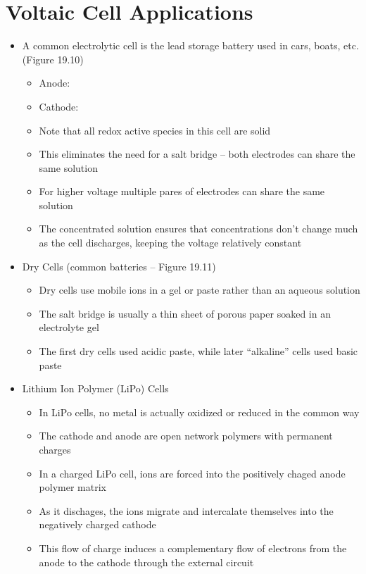 \documentclass[12pt, openany, letterpaper]{memoir}
\begin{document}
\section{Voltaic Cell Applications}
\begin{itemize}
	\item A common electrolytic cell is the lead storage battery used in cars, boats, etc. (Figure 19.10)
	\begin{itemize}
		\item Anode: 
		\item Cathode: 
		\item Note that all redox active species in this cell are solid
		\item This eliminates the need for a salt bridge -- both electrodes can share the same solution
		\item For higher voltage multiple pares of electrodes can share the same  solution
		\item The concentrated  solution ensures that concentrations don't change much as the cell discharges, keeping the voltage relatively constant
	\end{itemize}
	\item Dry Cells (common batteries -- Figure 19.11)
	\begin{itemize}
		\item Dry cells use mobile ions in a gel or paste rather than an aqueous solution
		\item The salt bridge is usually a thin sheet of porous paper soaked in an electrolyte gel
		\item The first dry cells used acidic paste, while later ``alkaline'' cells used basic paste
	\end{itemize}
	\item Lithium Ion Polymer (LiPo) Cells
	\begin{itemize}
		\item In LiPo cells, no metal is actually oxidized or reduced in the common way
		\item The cathode and anode are open network polymers with permanent charges
		\item In a charged LiPo cell,  ions are forced into the positively chaged anode polymer matrix
		\item As it dischages, the  ions migrate and intercalate themselves into the negatively charged cathode
		\item This flow of charge induces a complementary flow of electrons from the anode to the cathode through the external circuit

\end{itemize}
\end{itemize}
\end{document}
